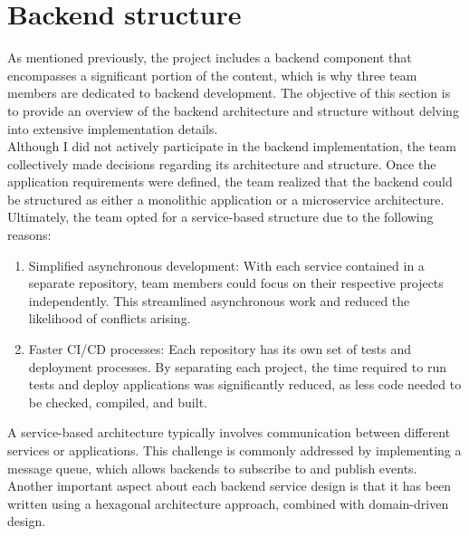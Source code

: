 \documentclass[./chapters/design.tex]{subfiles}
\begin{document}
\section{Backend structure}
As mentioned previously, the project includes a backend component that
encompasses a significant portion of the content, which is why three team
members are dedicated to backend development. The objective of this section is
to provide an overview of the backend architecture and structure without delving
into extensive implementation details.
\\
Although I did not actively participate in the backend implementation, the team
collectively made decisions regarding its architecture and structure. Once the
application requirements were defined, the team realized that the backend could
be structured as either a monolithic application or a microservice architecture.
Ultimately, the team opted for a service-based structure due to the following
reasons:
\\
\begin{enumerate}[label = -]
	\item Simplified asynchronous development: With each service contained in a
	      separate repository, team members could focus on their respective projects
	      independently. This streamlined asynchronous work and reduced the
	      likelihood of conflicts arising.
	\item Faster CI/CD processes: Each repository has its own set of tests and
	      deployment processes. By separating each project, the time required to run
	      tests and deploy applications was significantly reduced, as less code
	      needed to be checked, compiled, and built.
\end{enumerate}
A service-based architecture typically involves communication between different
services or applications. This challenge is commonly addressed by implementing a
message queue, which allows backends to subscribe to and publish events.
\\[8pt]
Another important aspect about each backend service design is that it has been
written using a hexagonal architecture approach, combined with domain-driven
design.
\end{document}
